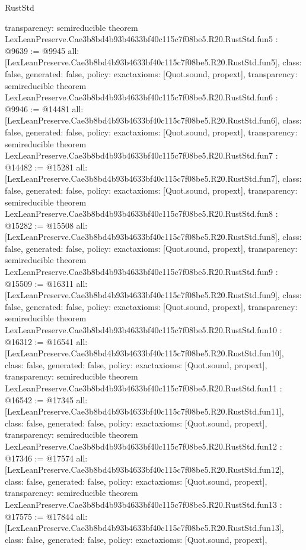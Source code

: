 \begin{lexlean}{RustStd}
\begin{coremodule}
{  transparency: semireducible
}
theorem LexLeanPreserve.Cae3b8bd4b93b4633bf40c115c7f08be5.R20.RustStd.fun5 : @9639 := @9945 {
  all: [LexLeanPreserve.Cae3b8bd4b93b4633bf40c115c7f08be5.R20.RustStd.fun5],
  class: false,
  generated: false,
  policy: exact{axioms: [Quot.sound, propext]},
  transparency: semireducible
}
theorem LexLeanPreserve.Cae3b8bd4b93b4633bf40c115c7f08be5.R20.RustStd.fun6 : @9946 := @14481 {
  all: [LexLeanPreserve.Cae3b8bd4b93b4633bf40c115c7f08be5.R20.RustStd.fun6],
  class: false,
  generated: false,
  policy: exact{axioms: [Quot.sound, propext]},
  transparency: semireducible
}
theorem LexLeanPreserve.Cae3b8bd4b93b4633bf40c115c7f08be5.R20.RustStd.fun7 : @14482 := @15281 {
  all: [LexLeanPreserve.Cae3b8bd4b93b4633bf40c115c7f08be5.R20.RustStd.fun7],
  class: false,
  generated: false,
  policy: exact{axioms: [Quot.sound, propext]},
  transparency: semireducible
}
theorem LexLeanPreserve.Cae3b8bd4b93b4633bf40c115c7f08be5.R20.RustStd.fun8 : @15282 := @15508 {
  all: [LexLeanPreserve.Cae3b8bd4b93b4633bf40c115c7f08be5.R20.RustStd.fun8],
  class: false,
  generated: false,
  policy: exact{axioms: [Quot.sound, propext]},
  transparency: semireducible
}
theorem LexLeanPreserve.Cae3b8bd4b93b4633bf40c115c7f08be5.R20.RustStd.fun9 : @15509 := @16311 {
  all: [LexLeanPreserve.Cae3b8bd4b93b4633bf40c115c7f08be5.R20.RustStd.fun9],
  class: false,
  generated: false,
  policy: exact{axioms: [Quot.sound, propext]},
  transparency: semireducible
}
theorem LexLeanPreserve.Cae3b8bd4b93b4633bf40c115c7f08be5.R20.RustStd.fun10 : @16312 := @16541 {
  all: [LexLeanPreserve.Cae3b8bd4b93b4633bf40c115c7f08be5.R20.RustStd.fun10],
  class: false,
  generated: false,
  policy: exact{axioms: [Quot.sound, propext]},
  transparency: semireducible
}
theorem LexLeanPreserve.Cae3b8bd4b93b4633bf40c115c7f08be5.R20.RustStd.fun11 : @16542 := @17345 {
  all: [LexLeanPreserve.Cae3b8bd4b93b4633bf40c115c7f08be5.R20.RustStd.fun11],
  class: false,
  generated: false,
  policy: exact{axioms: [Quot.sound, propext]},
  transparency: semireducible
}
theorem LexLeanPreserve.Cae3b8bd4b93b4633bf40c115c7f08be5.R20.RustStd.fun12 : @17346 := @17574 {
  all: [LexLeanPreserve.Cae3b8bd4b93b4633bf40c115c7f08be5.R20.RustStd.fun12],
  class: false,
  generated: false,
  policy: exact{axioms: [Quot.sound, propext]},
  transparency: semireducible
}
theorem LexLeanPreserve.Cae3b8bd4b93b4633bf40c115c7f08be5.R20.RustStd.fun13 : @17575 := @17844 {
  all: [LexLeanPreserve.Cae3b8bd4b93b4633bf40c115c7f08be5.R20.RustStd.fun13],
  class: false,
  generated: false,
  policy: exact{axioms: [Quot.sound, propext]},
}
\end{coremodule}
\end{lexlean}
